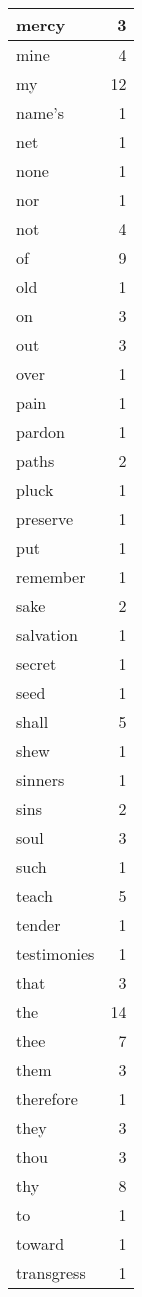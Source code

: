 \begin{center}
\begin{longtable}{l|r}
mercy & 3 \\ \hline
mine & 4 \\ \hline
my & 12 \\ \hline
name's & 1 \\ \hline
net & 1 \\ \hline
none & 1 \\ \hline
nor & 1 \\ \hline
not & 4 \\ \hline
of & 9 \\ \hline
old & 1 \\ \hline
on & 3 \\ \hline
out & 3 \\ \hline
over & 1 \\ \hline
pain & 1 \\ \hline
pardon & 1 \\ \hline
paths & 2 \\ \hline
pluck & 1 \\ \hline
preserve & 1 \\ \hline
put & 1 \\ \hline
remember & 1 \\ \hline
sake & 2 \\ \hline
salvation & 1 \\ \hline
secret & 1 \\ \hline
seed & 1 \\ \hline
shall & 5 \\ \hline
shew & 1 \\ \hline
sinners & 1 \\ \hline
sins & 2 \\ \hline
soul & 3 \\ \hline
such & 1 \\ \hline
teach & 5 \\ \hline
tender & 1 \\ \hline
testimonies & 1 \\ \hline
that & 3 \\ \hline
the & 14 \\ \hline
thee & 7 \\ \hline
them & 3 \\ \hline
therefore & 1 \\ \hline
they & 3 \\ \hline
thou & 3 \\ \hline
thy & 8 \\ \hline
to & 1 \\ \hline
toward & 1 \\ \hline
transgress & 1 \\ \hline

\end{longtable}
\end{center}
